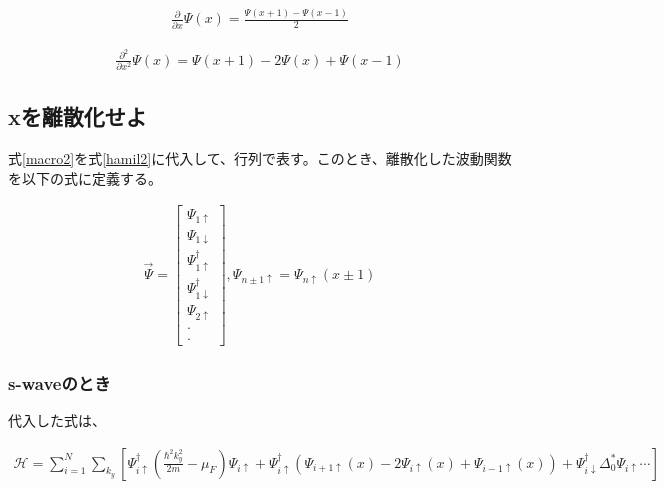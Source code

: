 \documentclass{jsarticle}
\begin{document}
            \begin{align}
                \frac{\partial}{\partial x}\Psi\left(x\right)=
                \frac{\Psi\left(x+1\right)-\Psi\left(x-1\right)}{2}
            \end{align}
    
            \begin{align}
                \frac{\partial^2}{\partial x^2}\Psi\left(x\right)=
                \Psi\left(x+1\right)-2\Psi\left(x\right)+\Psi\left(x-1\right)
                \label{macro2}
            \end{align}
    
            \subsection{xを離散化せよ}
            式\eqref{macro2}を式\eqref{hamil2}に代入して、行列で表す。このとき、離散化した波動関数を以下の式に定義する。
            
            \begin{align}
                \vec{\Psi}=
                \begin{bmatrix}
                    \Psi_{1\uparrow} \\
                    \Psi_{1\downarrow} \\
                    \Psi_{1\uparrow}^\dagger \\
                    \Psi_{1\downarrow}^\dagger \\
                    \Psi_{2\uparrow} \\
                    \cdot \\
                    \cdot
                \end{bmatrix},
                \Psi_{n\pm 1\uparrow}=\Psi_{n\uparrow}\left(x\pm 1\right)
            \end{align}
    
            \subsubsection{s-waveのとき}
            代入した式は、
    
            \begin{align}
                \mathcal{H}= \sum_{i=1}^N \sum_{k_y}
                \left[ \Psi^\dagger_{i\uparrow} \left( \frac{\hbar^2k_y^2}{2m}-\mu_F \right)\Psi_{i\uparrow}
                +\Psi^\dagger_{i\uparrow} \left( \Psi_{i+1\uparrow}\left(x\right)-2\Psi_{i\uparrow}\left(x\right)+\Psi_{i-1\uparrow}\left(x\right)
                \right)+\Psi^\dagger_{i\downarrow} \Delta_0^\ast \Psi_{i\uparrow} \cdots
                \right]
                \label{hamil'}
            \end{align}
    
\end{document}
